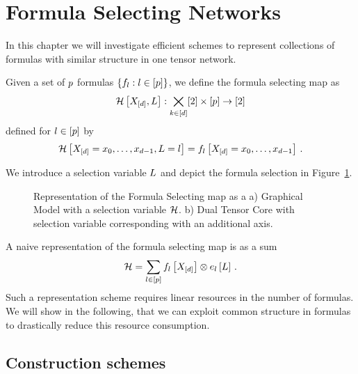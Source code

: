 \section{Formula Selecting Networks}\label{sec:superposedFT}\label{cha:formulaBatches}\label{cha:architectures}

In this chapter we will investigate efficient schemes to represent collections of formulas with similar structure in one tensor network.

\begin{definition}
	Given a set of $p$ formulas $\{f_{l} : l\in[p]\}$, we define the formula selecting map as
		\[  \mathcal{H}\left[X_{[d]},L\right] : \bigtimes_{k\in[d]}[2] \times [p] \rightarrow [2] \]
	defined for $l\in[p]$ by
		\[ \mathcal{H}\left[X_{[d]}={x_{0},\ldots,x_{d-1}},L=l\right] =  f_{l}\left[X_{[d]}={x_{0},\ldots,x_{d-1}}\right] \, . \]
\end{definition}

We introduce a selection variable $L$ and depict the formula selection in Figure~\ref{fig:formulaSelectionMap}.

\begin{figure}[h]
\begin{center}
	
\end{center}
\caption{Representation of the Formula Selecting map as a 
a) Graphical Model with a selection variable $\mathcal{H}$.
b) Dual Tensor Core with selection variable corresponding with an additional axis.}
\label{fig:formulaSelectionMap}
\end{figure}


A naive representation of the formula selecting map is as a sum
	\[ \mathcal{H} = \sum_{l\in[p]} f_{l}\left[X_{[d]}\right]  \otimes e_{l}\left[L\right] \, . \]
Such a representation scheme requires linear resources in the number of formulas.
We will show in the following, that we can exploit common structure in formulas to drastically reduce this resource consumption.



\subsection{Construction schemes}

